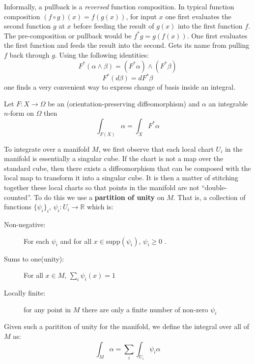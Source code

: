 Informally, a pullback is a \emph{reversed} function composition.
In typical function composition $(f \circ g)(x) = f(g(x))$, for input $x$ one first evaluates the second function $g$ at $x$
before feeding the result of $g(x)$ into the first function $f$.
The pre-composition or pullback would be $f^*g = g(f(x))$. 
One first evaluates the first function and feeds the result into the second.
Gets its name from pulling $f$ back through $g$.
Using the following identities:
\begin{equation}
	F^* (\alpha \wedge \beta ) = (F^* \alpha) \wedge (F^* \beta)
\end{equation}
\begin{equation}
	F^* (d \beta ) = dF^* \beta
\end{equation}
one finds a very convenient way to express change of basis inside an integral.

\begin{theorem}
Let $F : X  \to \Omega$ be an (orientation-preserving diffeomorphism) and $\alpha$ an integrable $n$-form on $\Omega$ then
\begin{equation}
\int_{F(X)} \alpha = \int_X F^* \alpha
\end{equation}
\end{theorem}



To integrate over a manifold $M$, we first observe that each local chart $U_i$ in the manifold is essentially a singular cube.
If the chart is not a map over the standard cube, then there exists a diffeomorphism 
that can be composed with the local map to transform it into a singular cube.
It is then a matter of stitching together these local charts so that points in the manifold are not ``double-counted''.
To do this we use a \textbf{partition of unity} on $M$.
That is, a collection of functions $\{ \psi_i \}_i$, $\psi_i: U_i \to \mathbb{R}$ which is:
\begin{description}
	\item[Non-negative:] For each $\psi_i$ and for all $x \in \text{supp}(\psi_i)$, $\psi_i \geq 0$ .
	\item[Sums to one(unity):] For all $x \in M$, $\sum_i \psi_i(x) = 1$
	\item[Locally finite:] for any point in $M$ there are only a finite number of non-zero $\psi_i$
\end{description}
Given such a parititon of unity for the manifold, we define the integral over all of $M$ as:
\begin{equation}
\int_M \alpha = \sum_i \int_{U_i} \psi_i \alpha
\end{equation}

